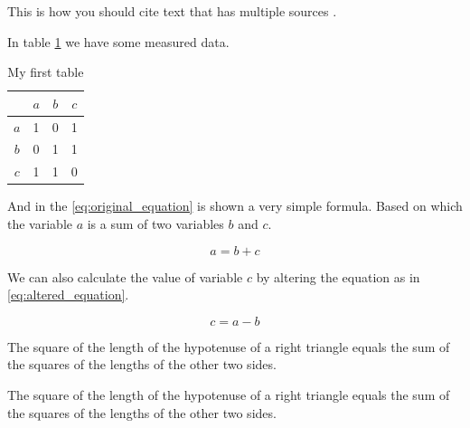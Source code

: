 This is how you should cite text that has multiple sources \cite{article_first, article_second}.

In table \ref{tab:first_table} we have some measured data.

\begin{table}[ht]
	\centering
	\caption{My first table}
	\label{tab:first_table}
	\begin{tabular}{|c|c|c|c|}
		\hline
		& $a$ & $b$ & $c$ \\
		\hline
		$a$ & 1 & 0 & 1 \\
		\hline
		$b$ & 0 & 1 & 1 \\
		\hline
		$c$ & 1 & 1 & 0 \\
		\hline
	\end{tabular}
\end{table}

And in the \eqref{eq:original_equation} is shown a very simple formula. Based on which the variable $a$ is a sum of two variables $b$ and $c$.

\begin{equation}
	\label{eq:original_equation}
	a = b + c
\end{equation}

We can also calculate the value of variable $c$ by altering the equation as in \eqref{eq:altered_equation}. 

\begin{equation}
	\label{eq:altered_equation}
	c = a - b
\end{equation}

\begin{thm}   %
The square of the length of the hypotenuse of a right triangle equals
the sum of the squares of the lengths of the other two sides.
\end{thm}

\begin{pf}    %
The square of the length of the hypotenuse of a right triangle equals the sum of the squares 
of the lengths of the other two sides.
\end{pf}

